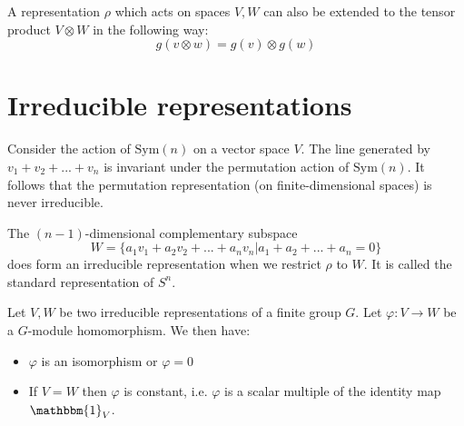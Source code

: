         \begin{example}
        	A representation $\rho$ which acts on spaces $V, W$ can also be extended to the tensor product  $V\otimes W$ in the following way:
            \begin{equation}
            	g(v\otimes w) = g(v)\otimes g(w)
            \end{equation}
        \end{example}

\section{Irreducible representations}

	
	\begin{example}
		Consider the action of $\text{Sym}(n)$ on a vector space $V$. The line generated by $v_1+v_2+...+v_n$ is invariant under the permutation action of $\text{Sym}(n)$. It follows that the permutation representation (on finite-dimensional spaces) is never irreducible.
		
		The $(n-1)$-dimensional complementary subspace
		\begin{equation}
			W = \{a_1v_1 + a_2v_2 + ... + a_nv_n|a_1 + a_2 + ... + a_n = 0\}
		\end{equation}
		does form an irreducible representation when we restrict $\rho$ to $W$. It is called the standard representation of $S^n$.
	\end{example}
        
        \begin{theorem}\label{rep:schurs_lemma}
        	Let $V, W$ be two irreducible representations of a finite group $G$. Let $\varphi: V\rightarrow W$ be a $G$-module homomorphism. We then have:
            	\begin{itemize}
	        	\item $\varphi$ is an isomorphism or $\varphi = 0$
	                \item If $V = W$ then $\varphi$ is constant, i.e. $\varphi$ is a scalar multiple of the identity map $\mathbbm{1}_V$.
        	\end{itemize}
        \end{theorem}
        
